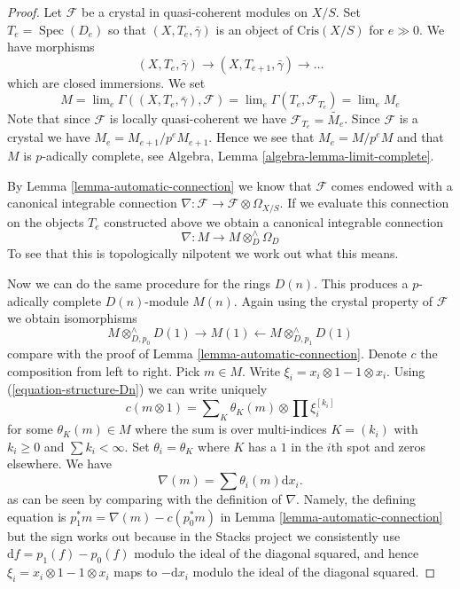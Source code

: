 \documentclass{stacks-project}
\theoremstyle{plain}
\theoremstyle{definition}
\theoremstyle{remark}
\numberwithin{equation}{subsection}
\def\lim{\mathop{\mathrm{lim}}\nolimits}
\def\Spec{\mathop{\mathrm{Spec}}}
\begin{document}
\begin{proof}
Let $\mathcal{F}$ be a crystal in quasi-coherent modules on $X/S$.
Set $T_e = \Spec(D_e)$ so that $(X, T_e, \bar\gamma)$ is an object
of $\text{Cris}(X/S)$ for $e \gg 0$. We have morphisms
$$
(X, T_e, \bar\gamma) \to (X, T_{e + 1}, \bar\gamma) \to \ldots
$$
which are closed immersions. We set
$$
M =
\lim_e \Gamma((X, T_e, \bar\gamma), \mathcal{F}) =
\lim_e \Gamma(T_e, \mathcal{F}_{T_e}) = \lim_e M_e
$$
Note that since $\mathcal{F}$ is locally quasi-coherent we have
$\mathcal{F}_{T_e} = \widetilde{M_e}$. Since $\mathcal{F}$ is a
crystal we have $M_e = M_{e + 1}/p^eM_{e + 1}$. Hence we see that
$M_e = M/p^eM$ and that $M$ is $p$-adically complete, see
Algebra, Lemma \ref{algebra-lemma-limit-complete}.

\medskip\noindent
By Lemma \ref{lemma-automatic-connection} we know that $\mathcal{F}$
comes endowed with a canonical integrable connection
$\nabla : \mathcal{F} \to \mathcal{F} \otimes \Omega_{X/S}$.
If we evaluate this connection on the objects $T_e$ constructed above
we obtain a canonical integrable connection
$$
\nabla : M \longrightarrow M \otimes^\wedge_D \Omega_D
$$
To see that this is topologically nilpotent we work out what this means.

\medskip\noindent
Now we can do the same procedure for the rings $D(n)$.
This produces a $p$-adically complete $D(n)$-module $M(n)$. Again using
the crystal property of $\mathcal{F}$ we obtain isomorphisms
$$
M \otimes^\wedge_{D, p_0} D(1) \rightarrow M(1)
\leftarrow M \otimes^\wedge_{D, p_1} D(1)
$$
compare with the proof of Lemma \ref{lemma-automatic-connection}.
Denote $c$ the composition from left to right. Pick $m \in M$.
Write $\xi_i = x_i \otimes 1 - 1 \otimes x_i$.
Using (\ref{equation-structure-Dn}) we can write uniquely
$$
c(m \otimes 1) = \sum\nolimits_K \theta_K(m) \otimes \prod \xi_i^{[k_i]}
$$
for some $\theta_K(m) \in M$ where the sum is over multi-indices
$K = (k_i)$ with $k_i \geq 0$ and $\sum k_i < \infty$. Set
$\theta_i = \theta_K$ where $K$ has a $1$ in the $i$th spot and
zeros elsewhere. We have
$$
\nabla(m) = \sum \theta_i(m) \text{d}x_i.
$$
as can be seen by comparing with the definition of
$\nabla$. Namely, the defining equation is
$p_1^*m = \nabla(m) - c(p_0^*m)$ in Lemma \ref{lemma-automatic-connection}
but the sign works out because in the Stacks project we consistently use
$\text{d}f = p_1(f) - p_0(f)$ modulo the ideal of the diagonal squared,
and hence $\xi_i = x_i \otimes 1 - 1 \otimes x_i$ maps to $-\text{d}x_i$
modulo the ideal of the diagonal squared.


\end{proof}
\end{document}
